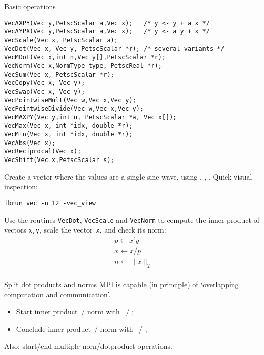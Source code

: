 \begin{numberedframe}{Basic operations}
\small
\begin{lstlisting}
VecAXPY(Vec y,PetscScalar a,Vec x);   /* y <- y + a x */
VecAYPX(Vec y,PetscScalar a,Vec x);   /* y <- a y + x */
VecScale(Vec x, PetscScalar a);
VecDot(Vec x, Vec y, PetscScalar *r); /* several variants */
VecMDot(Vec x,int n,Vec y[],PetscScalar *r);
VecNorm(Vec x,NormType type, PetscReal *r);
VecSum(Vec x, PetscScalar *r);
VecCopy(Vec x, Vec y);
VecSwap(Vec x, Vec y);
VecPointwiseMult(Vec w,Vec x,Vec y);
VecPointwiseDivide(Vec w,Vec x,Vec y);
VecMAXPY(Vec y,int n, PetscScalar *a, Vec x[]);
VecMax(Vec x, int *idx, double *r);
VecMin(Vec x, int *idx, double *r);
VecAbs(Vec x);
VecReciprocal(Vec x);
VecShift(Vec x,PetscScalar s);
\end{lstlisting}
\end{numberedframe}

\begin{exerciseframe}[vec]
  Create a vector where the values are a single sine wave.
  using , ,
  .
  Quick visual inspection:
\begin{verbatim}
ibrun vec -n 12 -vec_view
\end{verbatim}
\end{exerciseframe}

\begin{exerciseframe}[vec]
Use the routines \lstinline{VecDot}, \lstinline{VecScale} and \lstinline{VecNorm} to
compute the inner product of vectors \lstinline{x,y}, scale the vector~\lstinline{x},
and check its norm:
\[
\begin{array}{l}
p \leftarrow x^ty\\
x \leftarrow x/p\\
n \leftarrow \|x\|_2\\
\end{array}
\]
\end{exerciseframe}

\begin{details}
\begin{numberedframe}{Split dot products and norms}
  MPI is capable (in principle) of `overlapping computation and communication'.
  \begin{itemize}
  \item Start inner product~/ norm with ~/
    ;
  \item Conclude inner product~/ norm with ~/
    ;
  \end{itemize}
  Also: start/end multiple norn/dotproduct operations.
\end{numberedframe}
\end{details}

